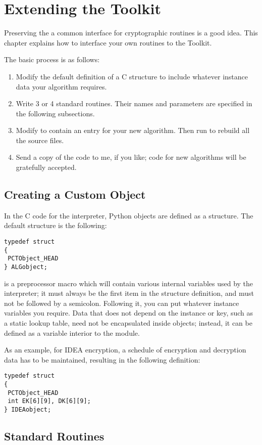 \documentclass{howto}
\begin{document}
\section{Extending the Toolkit}
Preserving the a common interface for cryptographic routines is a
good idea.  This chapter
explains how to interface your own routines to the Toolkit.

The basic process is as follows:
\begin{enumerate}
\item  Modify the default definition of a C structure to include
whatever instance data your algorithm requires.
\item  Write 3 or 4 standard routines.  Their names and parameters are
specified in the following subsections.
\item  Modify  to contain an entry for your new
algorithm.  Then run  to rebuild all the source files. 
\item  Send a copy of the code to me, if you like; code for new
algorithms will be gratefully accepted.
\end{enumerate}

\subsection{Creating a Custom Object}
In the C code for the interpreter, Python objects are defined as a
structure.  The default structure is the following:
\begin{verbatim}
typedef struct 
{
 PCTObject_HEAD
} ALGobject;
\end{verbatim}


 is a preprocessor macro which will contain various
internal variables used by the interpreter; it must always be the
first item in the structure definition, and must not be followed by a
semicolon.  Following it, you can put whatever instance variables you
require.  Data that does not depend on the instance or key, such as a
static lookup table, need not be encapsulated inside objects; instead,
it can be defined as a variable interior to the module.

As an example, for IDEA encryption, a schedule of encryption and
decryption data has to be maintained, resulting in the following
definition:
\begin{verbatim}
typedef struct 
{
 PCTObject_HEAD
 int EK[6][9], DK[6][9];
} IDEAobject;
\end{verbatim}


\subsection{Standard Routines}
\end{document}
